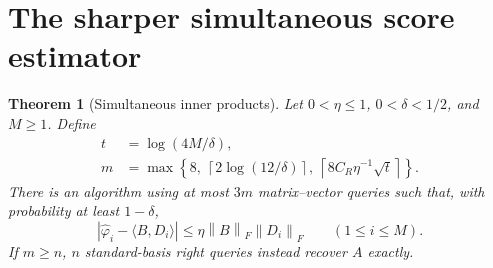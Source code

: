 \documentclass[11pt,oneside,openany,a4paper]{book}
\numberwithin{equation}{chapter}
\newtheorem{theorem}{Theorem}[chapter]
\theoremstyle{definition}
\theoremstyle{remark}
\newcommand{\F}[1]{\left\lVert#1\right\rVert_F}
\begin{document}
\section{The sharper simultaneous score estimator}
\begin{theorem}[Simultaneous inner products]\label{finite:thm:score}
Let $0<\eta\le1$, $0<\delta<1/2$, and $M\ge1$. Define
\begin{equation}\label{finite:eq:m}
\begin{split}
t&=\log(4M/\delta),\\
m&=\max\!\left\{8,\ \left\lceil2\log(12/\delta)\right\rceil,
\ \left\lceil8C_R\eta^{-1}\sqrt t\right\rceil\right\}.
\end{split}
\end{equation}
There is an algorithm using at most $3m$ matrix--vector queries such that, with probability at least $1-\delta$,
\begin{equation}\label{finite:eq:score}
|\widehat\varphi_i-\langle B,D_i\rangle|
\le\eta\F B\F{D_i}\qquad(1\le i\le M).
\end{equation}
If $m\ge n$, $n$ standard-basis right queries instead recover $A$ exactly.
\end{theorem}
\end{document}
